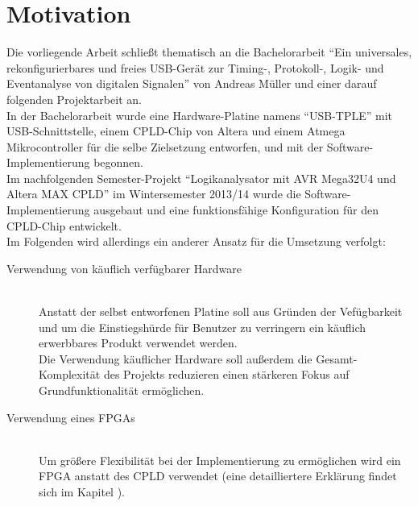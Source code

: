 \clearpage



\section{Motivation}
\label{ch:Einfuehrung:Motivation}

Die vorliegende Arbeit schließt thematisch an die Bachelorarbeit ``Ein universales, rekonfigurierbares und freies USB-Gerät zur Timing-, Protokoll-, Logik- und Eventanalyse von digitalen Signalen'' von Andreas Müller und einer darauf folgenden Projektarbeit an.\\
In der Bachelorarbeit wurde eine Hardware-Platine namens ``USB-TPLE'' mit USB-Schnittstelle, einem \acrshort{CPLD}-Chip von Altera und einem Atmega Mikrocontroller für die selbe Zielsetzung entworfen, und mit der Software-Implementierung begonnen\cite{ba:mueller}.\\  
Im nachfolgenden Semester-Projekt ``Logikanalysator mit AVR Mega32U4 und Altera MAX CPLD'' im Wintersemester 2013/14 wurde die Software-Implementierung ausgebaut und eine funktionsfähige Konfiguration für den CPLD-Chip entwickelt.\\

Im Folgenden wird allerdings ein anderer Ansatz für die Umsetzung verfolgt:
\begin{description}
\item[Verwendung von käuflich verfügbarer Hardware] \hfill \\
Anstatt der selbst entworfenen Platine soll aus Gründen der Vefügbarkeit und um die Einstiegshürde für Benutzer zu verringern ein käuflich erwerbbares Produkt verwendet werden.\\
Die Verwendung käuflicher Hardware soll außerdem die Gesamt-Komplexität des Projekts reduzieren einen stärkeren Fokus auf Grundfunktionalität ermöglichen.
\item[Verwendung eines FPGAs] \hfill \\
Um größere Flexibilität bei der Implementierung zu ermöglichen wird ein \gls{FPGA} anstatt des \gls{CPLD} verwendet (eine detailliertere Erklärung findet sich im Kapitel ).
\end{description}

